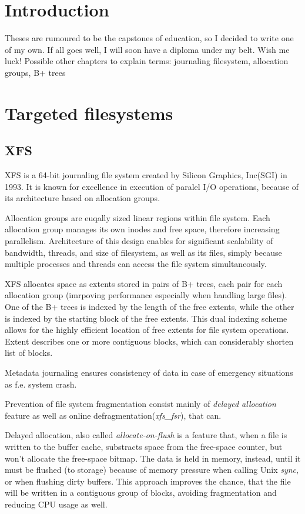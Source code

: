 \documentclass[
  color, %
  table, %
  lof,   %
  lot,   %
]{fithesis3}
\begin{document}
\chapter{Introduction}
Theses are rumoured to be the capstones of education, so I decided
to write one of my own. If all goes well, I will soon have a
diploma under my belt. Wish me luck!
Possible other chapters to explain terms: journaling filesystem, allocation groups, B+ trees

\chapter{Targeted filesystems}
\section{XFS}
% 
XFS is a 64-bit journaling file system created by Silicon Graphics, Inc(SGI) in 1993. It is known for excellence in execution of paralel I/O operations, because of its architecture based on allocation groups.

Allocation groups are euqally sized linear regions within file system. Each allocation group manages its own inodes and free space, therefore increasing parallelism.
Architecture of this design enables for significant scalability of bandwidth, threads, and size of filesystem, as well as its files, simply because multiple processes and threads can access the file system simultaneously.

XFS allocates space as extents stored in pairs of B+ trees, each pair for each allocation group (imrpoving performance especially when handling large files). One of the B+ trees is indexed by the length of the free extents, while the other is indexed by the starting block of the free extents. This dual indexing scheme allows for the highly efficient location of free extents for file system operations.
Extent describes one or more contiguous blocks, which can considerably shorten list of blocks.
 
Metadata journaling ensures consistency of data in case of emergency situations as f.e. system crash.

Prevention of file system fragmentation consist mainly of \textit{delayed allocation} feature as well as online defragmentation(\textit{xfs\_fsr}), that can. 

Delayed allocation, also called \textit{allocate-on-flush} is a feature that, when a file is written to the buffer cache, substracts space from the free-space counter, but won't allocate the free-space bitmap. The data is held in memory, instead, until it must be flushed (to storage) because of memory pressure when calling Unix \textit{sync}, or when flushing dirty buffers. This approach improves the chance, that the file will be written in a contiguous group of blocks, avoiding fragmentation and reducing CPU usage as well.
\end{document}
